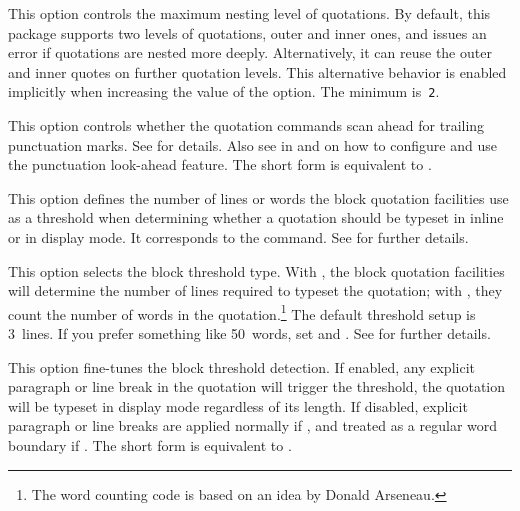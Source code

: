 \documentclass{ltxdockit}[2010/09/26]
\begin{document}
\begin{optionlist}

This option controls the maximum nesting level of quotations. By default, this package supports two levels of quotations, outer and inner ones, and issues an error if quotations are nested more deeply. Alternatively, it can reuse the outer and inner quotes on further quotation levels. This alternative behavior is enabled implicitly when increasing the value of the  option. The minimum is~\texttt{2}.


This option controls whether the quotation commands scan ahead for trailing punctuation marks. See  for details. Also see  in  and  on how to configure and use the punctuation look-ahead feature. The short form  is equivalent to .


This option defines the number of lines or words the block quotation facilities use as a threshold when determining whether a quotation should be typeset in inline or in display mode. It corresponds to the  command. See  for further details.


This option selects the block threshold type. With , the block quotation facilities will determine the number of lines required to typeset the quotation; with , they count the number of words in the quotation.\footnote{The word counting code is based on an idea by Donald Arseneau.} The default threshold setup is 3~lines. If you prefer something like 50~words, set  and . See  for further details.


This option fine-tunes the block threshold detection. If enabled, any explicit paragraph or line break in the quotation will trigger the threshold, \ie the quotation will be typeset in display mode regardless of its length. If disabled, explicit paragraph or line breaks are applied normally if , and treated as a regular word boundary if . The short form  is equivalent to .


\end{optionlist}
\end{document}
